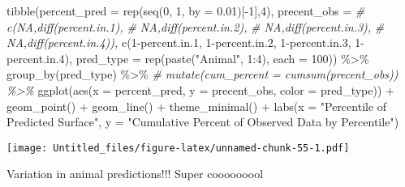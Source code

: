 \documentclass[
]{article}
\newenvironment{Shaded}{\begin{snugshade}}{\end{snugshade}}
\newcommand{\AttributeTok}[1]{\textcolor[rgb]{0.77,0.63,0.00}{#1}}
\newcommand{\CommentTok}[1]{\textcolor[rgb]{0.56,0.35,0.01}{\textit{#1}}}
\newcommand{\DecValTok}[1]{\textcolor[rgb]{0.00,0.00,0.81}{#1}}
\newcommand{\FloatTok}[1]{\textcolor[rgb]{0.00,0.00,0.81}{#1}}
\newcommand{\FunctionTok}[1]{\textcolor[rgb]{0.00,0.00,0.00}{#1}}
\newcommand{\NormalTok}[1]{#1}
\newcommand{\OtherTok}[1]{\textcolor[rgb]{0.56,0.35,0.01}{#1}}
\newcommand{\SpecialCharTok}[1]{\textcolor[rgb]{0.00,0.00,0.00}{#1}}
\newcommand{\StringTok}[1]{\textcolor[rgb]{0.31,0.60,0.02}{#1}}
\begin{document}
\begin{Shaded}
\begin{Highlighting}[]
\FunctionTok{tibble}\NormalTok{(}\AttributeTok{percent\_pred =} \FunctionTok{rep}\NormalTok{(}\FunctionTok{seq}\NormalTok{(}\DecValTok{0}\NormalTok{, }\DecValTok{1}\NormalTok{, }\AttributeTok{by =} \FloatTok{0.01}\NormalTok{)[}\SpecialCharTok{{-}}\DecValTok{1}\NormalTok{],}\DecValTok{4}\NormalTok{),}
       \AttributeTok{precent\_obs =} 
         \CommentTok{\# c(NA,diff(percent.in.1),}
         \CommentTok{\#   NA,diff(percent.in.2),}
         \CommentTok{\#   NA,diff(percent.in.3),}
         \CommentTok{\#   NA,diff(percent.in.4)),}
         \FunctionTok{c}\NormalTok{(}\DecValTok{1}\SpecialCharTok{{-}}\NormalTok{percent.in}\FloatTok{.1}\NormalTok{,}
           \DecValTok{1}\SpecialCharTok{{-}}\NormalTok{percent.in}\FloatTok{.2}\NormalTok{,}
           \DecValTok{1}\SpecialCharTok{{-}}\NormalTok{percent.in}\FloatTok{.3}\NormalTok{,}
           \DecValTok{1}\SpecialCharTok{{-}}\NormalTok{percent.in}\FloatTok{.4}\NormalTok{),}
       \AttributeTok{pred\_type =} \FunctionTok{rep}\NormalTok{(}\FunctionTok{paste}\NormalTok{(}\StringTok{"Animal"}\NormalTok{, }\DecValTok{1}\SpecialCharTok{:}\DecValTok{4}\NormalTok{), }
                       \AttributeTok{each =} \DecValTok{100}\NormalTok{)) }\SpecialCharTok{\%\textgreater{}\%} 
  \FunctionTok{group\_by}\NormalTok{(pred\_type) }\SpecialCharTok{\%\textgreater{}\%} 
  \CommentTok{\# mutate(cum\_percent = cumsum(precent\_obs)) \%\textgreater{}\% }
  \FunctionTok{ggplot}\NormalTok{(}\FunctionTok{aes}\NormalTok{(}\AttributeTok{x =}\NormalTok{ percent\_pred, }\AttributeTok{y =}\NormalTok{ precent\_obs, }\AttributeTok{color =}\NormalTok{ pred\_type)) }\SpecialCharTok{+}
  \FunctionTok{geom\_point}\NormalTok{() }\SpecialCharTok{+}
  \FunctionTok{geom\_line}\NormalTok{() }\SpecialCharTok{+}
  \FunctionTok{theme\_minimal}\NormalTok{() }\SpecialCharTok{+}
  \FunctionTok{labs}\NormalTok{(}\AttributeTok{x =} \StringTok{"Percentile of Predicted Surface"}\NormalTok{,}
       \AttributeTok{y =} \StringTok{"Cumulative Percent of Observed Data by Percentile"}\NormalTok{)}
\end{Highlighting}
\end{Shaded}

\texttt{[image: Untitled\_files/figure-latex/unnamed-chunk-55-1.pdf]}

Variation in animal predictions!!! Super cooooooool

\begin{Shaded}
\end{Shaded}
\end{document}
